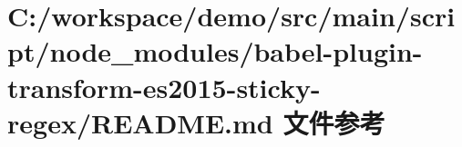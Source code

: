 \hypertarget{node__modules_2babel-plugin-transform-es2015-sticky-regex_2_r_e_a_d_m_e_8md}{}\section{C\+:/workspace/demo/src/main/script/node\+\_\+modules/babel-\/plugin-\/transform-\/es2015-\/sticky-\/regex/\+R\+E\+A\+D\+ME.md 文件参考}
\label{node__modules_2babel-plugin-transform-es2015-sticky-regex_2_r_e_a_d_m_e_8md}
